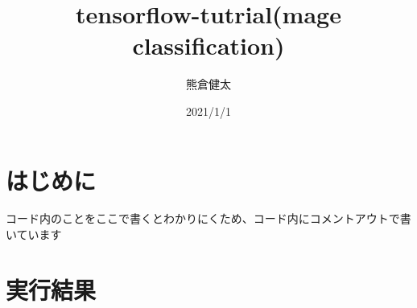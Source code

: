 \documentclass[a4paper,11pt]{jsarticle}
\begin{document}
\title{\huge tensorflow-tutrial(mage classification)}
\author{熊倉健太}
\date{2021/1/1}
\maketitle
\section{はじめに}
コード内のことをここで書くとわかりにくため、コード内にコメントアウトで書いています
\section{実行結果}
\end{document}
